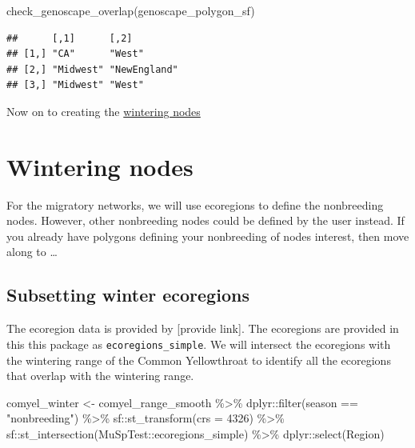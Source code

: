 \documentclass[
]{book}
\newenvironment{Shaded}{\begin{snugshade}}{\end{snugshade}}
\newcommand{\AttributeTok}[1]{\textcolor[rgb]{0.77,0.63,0.00}{#1}}
\newcommand{\DecValTok}[1]{\textcolor[rgb]{0.00,0.00,0.81}{#1}}
\newcommand{\FunctionTok}[1]{\textcolor[rgb]{0.00,0.00,0.00}{#1}}
\newcommand{\NormalTok}[1]{#1}
\newcommand{\OtherTok}[1]{\textcolor[rgb]{0.56,0.35,0.01}{#1}}
\newcommand{\SpecialCharTok}[1]{\textcolor[rgb]{0.00,0.00,0.00}{#1}}
\newcommand{\StringTok}[1]{\textcolor[rgb]{0.31,0.60,0.02}{#1}}
\begin{document}
\begin{Shaded}
\begin{Highlighting}[]
\FunctionTok{check\_genoscape\_overlap}\NormalTok{(genoscape\_polygon\_sf)}
\end{Highlighting}
\end{Shaded}

\begin{verbatim}
##      [,1]      [,2]        
## [1,] "CA"      "West"      
## [2,] "Midwest" "NewEngland"
## [3,] "Midwest" "West"
\end{verbatim}

Now on to creating the \protect\hyperlink{wintering}{wintering nodes}

\hypertarget{wintering}{%
\chapter{Wintering nodes}\label{wintering}}

For the migratory networks, we will use ecoregions to define the nonbreeding nodes. However, other nonbreeding nodes could be defined by the user instead. If you already have polygons defining your nonbreeding of nodes interest, then move along to \ldots{}

\hypertarget{subsetting-winter-ecoregions}{%
\section{Subsetting winter ecoregions}\label{subsetting-winter-ecoregions}}

The ecoregion data is provided by {[}provide link{]}. The ecoregions are provided in this this package as \texttt{ecoregions\_simple}. We will intersect the ecoregions with the wintering range of the Common Yellowthroat to identify all the ecoregions that overlap with the wintering range.

\begin{Shaded}
\begin{Highlighting}[]
\NormalTok{comyel\_winter }\OtherTok{\textless{}{-}}\NormalTok{ comyel\_range\_smooth }\SpecialCharTok{\%\textgreater{}\%}
\NormalTok{  dplyr}\SpecialCharTok{::}\FunctionTok{filter}\NormalTok{(season }\SpecialCharTok{==} \StringTok{"nonbreeding"}\NormalTok{) }\SpecialCharTok{\%\textgreater{}\%}
\NormalTok{  sf}\SpecialCharTok{::}\FunctionTok{st\_transform}\NormalTok{(}\AttributeTok{crs =} \DecValTok{4326}\NormalTok{) }\SpecialCharTok{\%\textgreater{}\%}
\NormalTok{  sf}\SpecialCharTok{::}\FunctionTok{st\_intersection}\NormalTok{(MuSpTest}\SpecialCharTok{::}\NormalTok{ecoregions\_simple) }\SpecialCharTok{\%\textgreater{}\%}
\NormalTok{  dplyr}\SpecialCharTok{::}\FunctionTok{select}\NormalTok{(Region)}
\end{Highlighting}
\end{Shaded}
\end{document}
